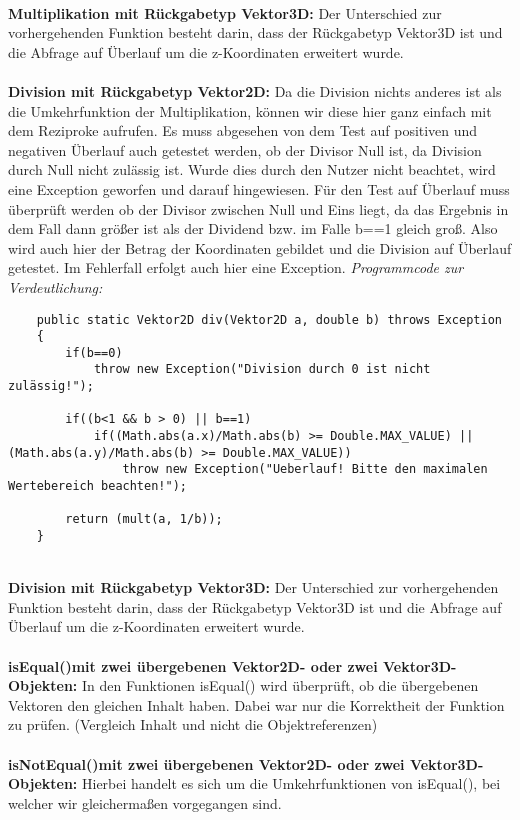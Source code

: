 \documentclass[a4paper,11pt]{scrartcl}
\begin{document}
\\
\textbf{Multiplikation mit Rückgabetyp Vektor3D:} Der Unterschied zur vorhergehenden Funktion besteht darin, dass der Rückgabetyp Vektor3D ist und die Abfrage auf Überlauf um die z-Koordinaten erweitert wurde.\\
\\
\textbf{Division mit Rückgabetyp Vektor2D:} Da die Division nichts anderes ist als die Umkehrfunktion der Multiplikation, können wir diese hier ganz einfach mit dem Reziproke aufrufen. Es muss abgesehen von dem Test auf positiven und negativen Überlauf auch getestet werden, ob der Divisor Null ist, da Division durch Null nicht zulässig ist. Wurde dies durch den Nutzer nicht beachtet, wird eine Exception geworfen und darauf hingewiesen.
Für den Test auf Überlauf muss überprüft werden ob der Divisor zwischen Null und Eins liegt, da das Ergebnis in dem Fall dann größer ist als der Dividend bzw. im Falle b==1 gleich groß. Also wird auch hier der Betrag der Koordinaten gebildet und die Division auf Überlauf getestet. Im Fehlerfall erfolgt auch hier eine Exception.
\textit{Programmcode zur Verdeutlichung:}
\begin{lstlisting}
	public static Vektor2D div(Vektor2D a, double b) throws Exception
	{
		if(b==0)
			throw new Exception("Division durch 0 ist nicht zulässig!");
		
		if((b<1 && b > 0) || b==1)
			if((Math.abs(a.x)/Math.abs(b) >= Double.MAX_VALUE) || (Math.abs(a.y)/Math.abs(b) >= Double.MAX_VALUE))
				throw new Exception("Ueberlauf! Bitte den maximalen Wertebereich beachten!");
		
		return (mult(a, 1/b));
	}
\end{lstlisting} $\;$ \\
\\
\textbf{Division mit Rückgabetyp Vektor3D:} Der Unterschied zur vorhergehenden Funktion besteht darin, dass der Rückgabetyp Vektor3D ist und die Abfrage auf Überlauf um die z-Koordinaten erweitert wurde.\\
\\
\textbf{isEqual()mit zwei übergebenen Vektor2D- oder zwei Vektor3D-Objekten: } In den Funktionen isEqual() wird überprüft, ob die übergebenen Vektoren den gleichen Inhalt haben. Dabei war nur die Korrektheit der Funktion zu prüfen. (Vergleich Inhalt und nicht die Objektreferenzen)\\
\\
\textbf{isNotEqual()mit zwei übergebenen Vektor2D- oder zwei Vektor3D-Objekten: } Hierbei handelt es sich um die Umkehrfunktionen von isEqual(), bei welcher wir gleichermaßen vorgegangen sind.\\
\end{document}
